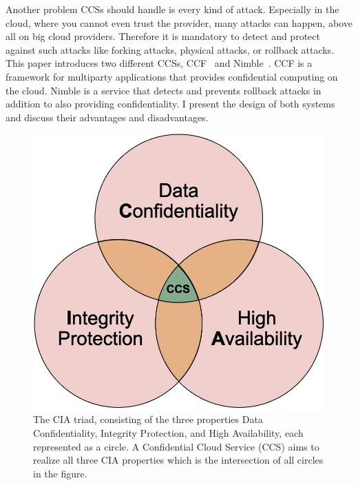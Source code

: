  Another problem CCSs should handle is every kind of attack. Especially in the cloud, where you cannot even trust the provider, many attacks can happen, above all on big cloud providers. Therefore it is mandatory to detect and protect against such attacks like forking attacks, physical attacks, or rollback attacks.\\
 This paper introduces two different CCSs, CCF~\cite{Howard} and Nimble~\cite{Nimble}. CCF is a framework for multiparty applications that provides confidential computing on the cloud. Nimble is a service that detects and prevents rollback attacks in addition to also providing confidentiality. I present the design of both systems and discuss their advantages and disadvantages.
	 
 \begin{figure}[t]
	\includegraphics[scale=0.17]{pictures/cia_new}
	\caption{The CIA triad, consisting of the three properties Data Confidentiality, Integrity Protection, and High Availability, each represented as a circle. A Confidential Cloud Service (CCS) aims to realize all three CIA properties which is the intersection of all circles in the figure.  }
	\label{cia}
\end{figure}